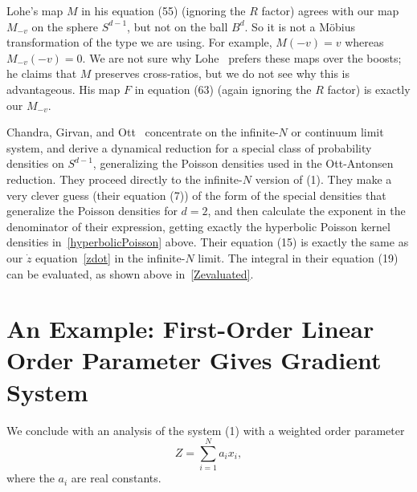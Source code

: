 \documentclass[%
 aip,
 amsmath,amssymb,
 reprint,%
]{revtex4-1}
\begin{document}
Lohe's map $M$ in his equation (55) (ignoring the $R$ factor) agrees with our map $M_{-v}$ on the sphere $S^{d-1}$, but not on the ball $B^d$.  So it is not a M\"obius transformation of the type we are using.  For example, $M(-v) = v$ whereas $ M_{-v} (-v) = 0$.  We are not sure why Lohe~\cite{lohe2018higher} prefers these maps over the boosts; he claims that $M$ preserves cross-ratios, but we do not see why this is advantageous.  His map $F$ in equation (63) (again ignoring the $R$ factor) is exactly our $M_{-v}$.

Chandra, Girvan, and Ott~\cite{chandra2019complexity} concentrate on the infinite-$N$ or continuum limit system, and derive a dynamical reduction for a special class of probability densities on $S^{d-1}$, generalizing the Poisson densities used in the Ott-Antonsen reduction. They proceed directly to the infinite-$N$ version of (1). They make a very clever guess (their equation (7)) of the form of the special densities that generalize the Poisson densities for $d=2$, and then calculate the exponent in the denominator of their expression, getting exactly the hyperbolic Poisson kernel densities  in~\eqref{hyperbolicPoisson} above. Their equation (15) is exactly the same as our $\dot z$ equation~\eqref{zdot} in the infinite-$N$ limit.  The integral in their equation (19) can be evaluated, as shown above in~\eqref{Zevaluated}.

\section{\label{sec:level1}An Example:  First-Order Linear Order Parameter Gives Gradient System}

We conclude with an analysis of the system (1) with a weighted order parameter 
\begin{equation}
Z = \sum_{i=1}^N a_i x_i, \label{orderparameter}
\end{equation}
where the $a_i$ are real constants.  
\end{document}
